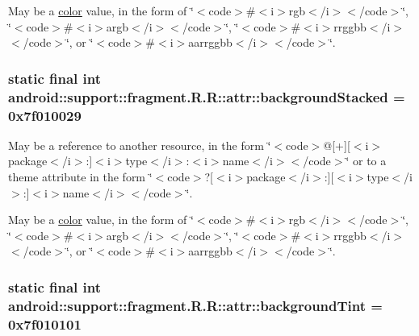 May be a \hyperlink{classandroid_1_1support_1_1fragment_1_1_r_1_1color}{color} value, in the form of \char`\"{}$<$code$>$\#$<$i$>$rgb$<$/i$>$$<$/code$>$\char`\"{}, \char`\"{}$<$code$>$\#$<$i$>$argb$<$/i$>$$<$/code$>$\char`\"{}, \char`\"{}$<$code$>$\#$<$i$>$rrggbb$<$/i$>$$<$/code$>$\char`\"{}, or \char`\"{}$<$code$>$\#$<$i$>$aarrggbb$<$/i$>$$<$/code$>$\char`\"{}. \hypertarget{classandroid_1_1support_1_1fragment_1_1_r_1_1attr_573c22f959b3002d324ba353ccfc3804}{
\subsubsection[{backgroundStacked}]{\setlength{\rightskip}{0pt plus 5cm}static final int android::support::fragment.R.R::attr::backgroundStacked = 0x7f010029}}
\label{classandroid_1_1support_1_1fragment_1_1_r_1_1attr_573c22f959b3002d324ba353ccfc3804}


May be a reference to another resource, in the form \char`\"{}$<$code$>$@\mbox{[}+\mbox{]}\mbox{[}$<$i$>$package$<$/i$>$:\mbox{]}$<$i$>$type$<$/i$>$:$<$i$>$name$<$/i$>$$<$/code$>$\char`\"{} or to a theme attribute in the form \char`\"{}$<$code$>$?\mbox{[}$<$i$>$package$<$/i$>$:\mbox{]}\mbox{[}$<$i$>$type$<$/i$>$:\mbox{]}$<$i$>$name$<$/i$>$$<$/code$>$\char`\"{}. 

May be a \hyperlink{classandroid_1_1support_1_1fragment_1_1_r_1_1color}{color} value, in the form of \char`\"{}$<$code$>$\#$<$i$>$rgb$<$/i$>$$<$/code$>$\char`\"{}, \char`\"{}$<$code$>$\#$<$i$>$argb$<$/i$>$$<$/code$>$\char`\"{}, \char`\"{}$<$code$>$\#$<$i$>$rrggbb$<$/i$>$$<$/code$>$\char`\"{}, or \char`\"{}$<$code$>$\#$<$i$>$aarrggbb$<$/i$>$$<$/code$>$\char`\"{}. \hypertarget{classandroid_1_1support_1_1fragment_1_1_r_1_1attr_0918ac135eecd5f90516301b6d9d0976}{
\subsubsection[{backgroundTint}]{\setlength{\rightskip}{0pt plus 5cm}static final int android::support::fragment.R.R::attr::backgroundTint = 0x7f010101}}
\label{classandroid_1_1support_1_1fragment_1_1_r_1_1attr_0918ac135eecd5f90516301b6d9d0976}


